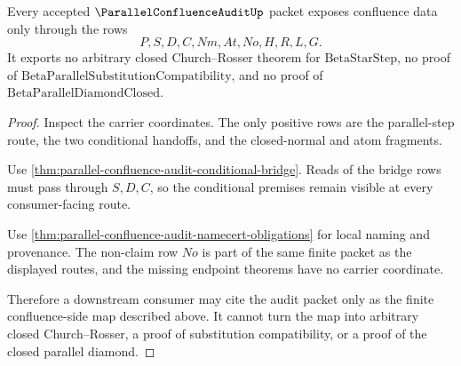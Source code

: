 \begin{theorem}
\label{thm:parallel-confluence-audit-nonescape}
Every accepted $\ParallelConfluenceAuditUp$ packet exposes confluence data only through the rows
$$
P,S,D,C,Nm,At,No,H,R,L,G.
$$
It exports no arbitrary closed Church--Rosser theorem for $\mathrm{BetaStarStep}$, no proof of $\mathrm{BetaParallelSubstitutionCompatibility}$, and no proof of $\mathrm{BetaParallelDiamondClosed}$.
\end{theorem}
\begin{proof}
Inspect the carrier coordinates. The only positive rows are the parallel-step route, the two conditional handoffs, and the closed-normal and atom fragments.

Use \autoref{thm:parallel-confluence-audit-conditional-bridge}. Reads of the bridge rows must pass through $S,D,C$, so the conditional premises remain visible at every consumer-facing route.

Use \autoref{thm:parallel-confluence-audit-namecert-obligations} for local naming and provenance. The non-claim row $No$ is part of the same finite packet as the displayed routes, and the missing endpoint theorems have no carrier coordinate.

Therefore a downstream consumer may cite the audit packet only as the finite confluence-side map described above. It cannot turn the map into arbitrary closed Church--Rosser, a proof of substitution compatibility, or a proof of the closed parallel diamond.
\end{proof}

